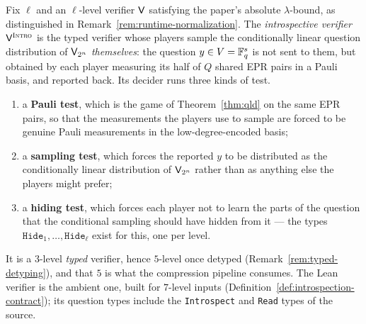 \begin{definition}
\label{def:intro-verifier}
\leanok
Fix $\ell$ and an $\ell$-level verifier $\mathsf{V}$ satisfying the paper's absolute
$\lambda$-bound, as distinguished in Remark~\ref{rem:runtime-normalization}. The
\emph{introspective verifier} $\mathsf{V}^{\textsc{Intro}}$ is the typed verifier whose players sample the
conditionally linear question distribution of $\mathsf{V}_{2^n}$ \emph{themselves}: the
question $y \in V = \mathbb{F}_q^s$ is not sent to them, but obtained by each player measuring its
half of $Q$ shared EPR pairs in a Pauli basis, and reported back. Its decider runs three
kinds of test.
\begin{enumerate}
\item a \textbf{Pauli test}, which is the game of Theorem~\ref{thm:qld} on the same EPR
  pairs, so that the measurements the players use to sample are forced to be genuine Pauli
  measurements in the low-degree-encoded basis;
\item a \textbf{sampling test}, which forces the reported $y$ to be distributed as the
  conditionally linear distribution of $\mathsf{V}_{2^n}$ rather than as anything else the
  players might prefer;
\item a \textbf{hiding test}, which forces each player not to learn the parts of the
  question that the conditional sampling should have hidden from it --- the types
  $\mathtt{Hide}_1, \ldots, \mathtt{Hide}_\ell$ exist for this, one per level.
\end{enumerate}
It is a $3$-level \emph{typed} verifier, hence $5$-level once detyped
(Remark~\ref{rem:typed-detyping}), and that $5$ is what the compression pipeline consumes.
The Lean verifier is the ambient one, built for $7$-level inputs
(Definition~\ref{def:introspection-contract}); its question types include the
\texttt{Introspect} and \texttt{Read} types of the source.
\end{definition}

\effortHard

